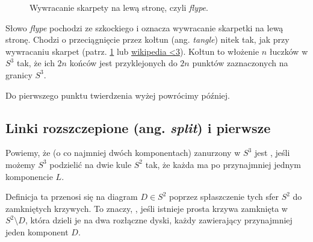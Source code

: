 \documentclass{article}
\begin{document}
\begin{figure}[h]\centering
  \caption{\label{flype}Wywracanie skarpety na lewą stronę, czyli \emph{flype}.}
\end{figure}

Słowo \emph{flype} pochodzi ze szkockiego i oznacza wywracanie skarpetki na lewą stronę. Chodzi o przeciągnięcie przez kołtun (ang. \emph{tangle}) nitek tak, jak przy wywracaniu skarpet (patrz. \cref{flype} lub \href{https://en.wikipedia.org/wiki/Flype}{wikipedia <3}). Kołtun to włożenie $n$ łuczków w $S^3$ tak, że ich $2n$ końców jest przyklejonych do $2n$ punktów zaznaczonych na granicy $S^3$.

Do pierwszego punktu twierdzenia wyżej powrócimy później. %

\subsection{Linki rozszczepione (ang. \emph{split}) i pierwsze}

\begin{deff}
  Powiemy, że  (o co najmniej dwóch komponentach) zanurzony w $S^3$ jest , jeśli możemy $S^3$ podzielić na dwie kule $S^2$ tak, że każda ma po przynajmniej jednym komponencie $L$. 

  Definicja ta przenosi się na diagram $D\in S^2$ poprzez spłaszczenie tych sfer $S^2$ do zamkniętych krzywych. To znaczy, , jeśli istnieje prosta krzywa zamknięta w $S^2\setminus D$, która dzieli je na dwa rozłączne dyski, każdy zawierający przynajmniej jeden komponent $D$.
\end{deff}
\end{document}
